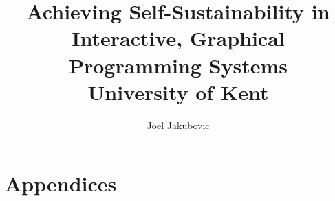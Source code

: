 \documentclass[12pt]{report}
\title{
  {Achieving Self-Sustainability in Interactive, Graphical Programming Systems}\\
  {\large University of Kent}
}
\author{Joel Jakubovic}
\begin{document}
\maketitle

\newcommand{\joel}[1]{}
\newcommand{\tomas}[1]{}
\newcommand{\tp}[1]{}
\newcommand{\note}[1]{}
\newcommand{\notes}[1]{}
\newcommand{\todo}[1]{\textbf{TODO: #1}}
\newcommand{\delete}[1]{\textbf{DELETE:}#1}
\newcommand{\naive}{na\"ive}
\newcommand{\OROM}{Id}
\newcommand{\svgel}[1]{\texttt{\textless{}#1\textgreater{}}}
\newcommand{\OSFA}{One-Size-Fits-All}
\newcommand{\xywh}{\texttt{x},\texttt{y},\texttt{width},\texttt{height}}
%
\newcommand{\mybox}[1]{\noindent\fbox{\parbox{\textwidth}{#1}}}
\providecommand{\tightlist}{}%
\newenvironment{longtable}[2]{\begin{tabular}}{\end{tabular}}
\newenvironment{head}{}{}
\newtheorem{heuristic}{Heuristic}
\newtheorem*{defn}{Definition}










\chapter*{Appendices}
\appendix




\printbibliography
\end{document}

